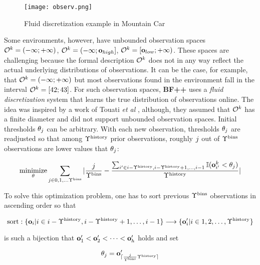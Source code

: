 \begin{figure}
    \centering
    \texttt{[image: observ.png]}
    \caption{Fluid discretization example in Mountain Car}
    \label{fig:obs}
\end{figure}

Some environments, however, have unbounded observation spaces $\mathcal{O}^k=(-\infty;+\infty)$, $\mathcal{O}^k=(-\infty;\mathbf{o}_{high}]$,  $\mathcal{O}^k=[\mathbf{o}_{low};+\infty)$.
These spaces are challenging because the formal description $\mathcal{O}^k$ does not in any way reflect the actual underlying distributions of observations.
It can be the case, for example, that $\mathcal{O}^k=(-\infty;+\infty)$ but most observations found in the environment fall in the interval $\mathcal{O}^k=[42;43]$.
For such observation spaces, \textbf{BF++} uses a \textit{fluid discretization} system that learns the true distribution of observations online. The idea was inspired by a work of Touati {\sl et al} \cite{adaptivediscretization}, although, they assumed that $\mathcal{O}^k$ has a finite diameter and did not support unbounded observation spaces.
Initial thresholds $\theta_j$ can be arbitrary.
With each new observation, thresholds $\theta_j$ are readjusted so that among $\Upsilon^\text{history}$ prior observations, roughly $j$ out of $\Upsilon^\text{bins}$  observations are lower values that $\theta_j$:

\begin{equation}
\underset{\theta}{\text{minimize}} \sum_{j \in 0,1,\dots \Upsilon^\text{bins}} |\frac{j}{\Upsilon^\text{bins}} - \frac{\sum_{i' \in i-\Upsilon^\text{history},i-\Upsilon^\text{history}+1,\dots,i-1} \mathbb{I}(\mathbf{o}_{i'}^k < \theta_j)}{\Upsilon^\text{history}}|
\end{equation}

To solve this optimization problem, one has to sort previous $\Upsilon^\text{bins}$ observations in ascending order so that 

\begin{equation}
    \text{sort}: \{\mathbf{o}_i | i \in i-\Upsilon^\text{history},i-\Upsilon^\text{history}+1,\dots,i-1\} \longrightarrow \{ \mathbf{o}'_i | i \in 1,2,\dots,\Upsilon^\text{history} \}
\end{equation}

is such a bijection that $\mathbf{o}'_1 < \mathbf{o}'_2 < \dots < \mathbf{o}'_h$ holds and set

\begin{equation}
    \theta_{j} = \mathbf{o}'_{\lceil \frac{j}{\Upsilon^\text{bins}} \Upsilon^\text{history} \rceil}
\end{equation}

